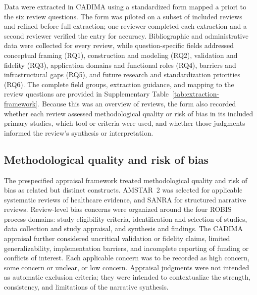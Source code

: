 Data were extracted in CADIMA using a standardized form mapped a priori to the six review questions. The form was piloted on a subset of included reviews and refined before full extraction; one reviewer completed each extraction and a second reviewer verified the entry for accuracy. Bibliographic and administrative data were collected for every review, while question-specific fields addressed conceptual framing (RQ1), construction and modeling (RQ2), validation and fidelity (RQ3), application domains and functional roles (RQ4), barriers and infrastructural gaps (RQ5), and future research and standardization priorities (RQ6). The complete field groups, extraction guidance, and mapping to the review questions are provided in Supplementary Table~\ref{tab:extraction-framework}. Because this was an overview of reviews, the form also recorded whether each review assessed methodological quality or risk of bias in its included primary studies, which tool or criteria were used, and whether those judgments informed the review's synthesis or interpretation.

\subsection{Methodological quality and risk of bias}

The prespecified appraisal framework treated methodological quality and risk of bias as related but distinct constructs. AMSTAR~2 was selected for applicable systematic reviews of healthcare evidence, and SANRA for structured narrative reviews.\cite{shea2017amstar2,baethge2019sanra} Review-level bias concerns were organized around the four ROBIS process domains: study eligibility criteria, identification and selection of studies, data collection and study appraisal, and synthesis and findings.\cite{whiting2016robis} The CADIMA appraisal further considered uncritical validation or fidelity claims, limited generalizability, implementation barriers, and incomplete reporting of funding or conflicts of interest. Each applicable concern was to be recorded as high concern, some concern or unclear, or low concern. Appraisal judgments were not intended as automatic exclusion criteria; they were intended to contextualize the strength, consistency, and limitations of the narrative synthesis.



